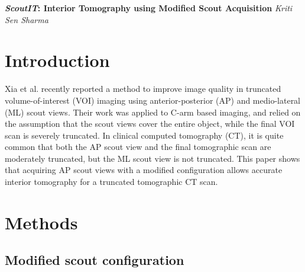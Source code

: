 \documentclass[]{spie}
\begin{document}
{\center \LARGE \textbf{\textit{ScoutIT}:   Interior Tomography using Modified Scout Acquisition}}
\linebreak
\linebreak
\vspace{1.5 cm} 
{\Large \textit{Kriti Sen Sharma} }

\tableofcontents
\setcounter{tocdepth}{0}



\section{Introduction}
\label{sec:introduction}

Xia et al. \cite{Xia2015} recently reported a method to improve image quality in truncated volume-of-interest (VOI) imaging using anterior-posterior (AP) and medio-lateral (ML) scout views. Their work was applied to C-arm based imaging, and relied on the assumption that the scout views cover the entire object, while the final VOI scan is severely truncated. In clinical computed tomography (CT), it is quite common that both the AP scout view and the final tomographic scan are moderately truncated, but the ML scout view is not truncated. This paper shows that acquiring AP scout views with a modified configuration allows accurate interior tomography for a truncated tomographic CT scan. 

\section{Methods}
\label{sec:methods}




\subsection{Modified scout configuration}
\label{ssec:modified_scout}
\end{document}
